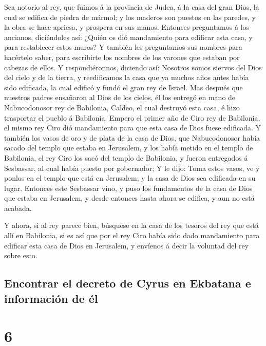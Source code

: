  Sea notorio al rey, que fuimos á la provincia de Judea, á
la casa del gran Dios, la cual se edifica de piedra de mármol; y los
maderos son puestos en las paredes, y la obra se hace apriesa, y
prospera en sus manos.  Entonces preguntamos á los ancianos,
diciéndoles así: ¿Quién os dió mandamiento para edificar esta casa, y
para restablecer estos muros?  Y también les preguntamos
sus nombres para hacértelo saber, para escribirte los nombres de los
varones que estaban por cabezas de ellos.  Y
respondiéronnos, diciendo así: Nosotros somos siervos del Dios del cielo
y de la tierra, y reedificamos la casa que ya muchos años antes había
sido edificada, la cual edificó y fundó el gran rey de Israel.
 Mas después que nuestros padres ensañaron al Dios de los
cielos, él los entregó en mano de Nabucodonosor rey de Babilonia,
Caldeo, el cual destruyó esta casa, é hizo trasportar el pueblo á
Babilonia.  Empero el primer año de Ciro rey de Babilonia,
el mismo rey Ciro dió mandamiento para que esta casa de Dios fuese
edificada.  Y también los vasos de oro y de plata de la
casa de Dios, que Nabucodonosor había sacado del templo que estaba en
Jerusalem, y los había metido en el templo de Babilonia, el rey Ciro los
sacó del templo de Babilonia, y fueron entregados á Sesbassar, al cual
había puesto por gobernador;  Y le dijo: Toma estos vasos,
ve y ponlos en el templo que está en Jerusalem; y la casa de Dios sea
edificada en su lugar.  Entonces este Sesbassar vino, y
puso los fundamentos de la casa de Dios que estaba en Jerusalem, y desde
entonces hasta ahora se edifica, y aun no está acabada.

 Y ahora, si al rey parece bien, búsquese en la casa de los
tesoros del rey que está allí en Babilonia, si es así que por el rey
Ciro había sido dado mandamiento para edificar esta casa de Dios en
Jerusalem, y envíenos á decir la voluntad del rey sobre esto.

\hypertarget{encontrar-el-decreto-de-cyrus-en-ekbatana-e-informaciuxf3n-de-uxe9l}{%
\subsection{Encontrar el decreto de Cyrus en Ekbatana e información de
él}\label{encontrar-el-decreto-de-cyrus-en-ekbatana-e-informaciuxf3n-de-uxe9l}}

\hypertarget{section-5}{%
\section{6}\label{section-5}}

